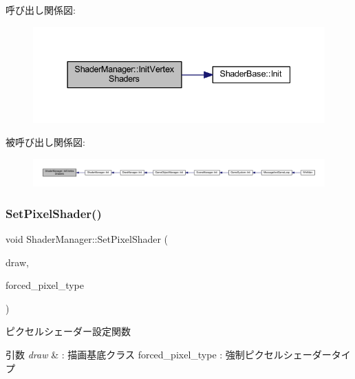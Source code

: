 呼び出し関係図\+:
\nopagebreak
\begin{figure}[H]
\begin{center}
\leavevmode
\includegraphics[width=337pt]{class_shader_manager_a9881e89daff32662e10f6ac48212ca06_cgraph}
\end{center}
\end{figure}
被呼び出し関係図\+:
\nopagebreak
\begin{figure}[H]
\begin{center}
\leavevmode
\includegraphics[width=350pt]{class_shader_manager_a9881e89daff32662e10f6ac48212ca06_icgraph}
\end{center}
\end{figure}
\mbox{\label{class_shader_manager_a6c954293001a33fafff216ff719618d5}} 
\subsubsection{\texorpdfstring{Set\+Pixel\+Shader()}{SetPixelShader()}}
{\footnotesize\ttfamily void Shader\+Manager\+::\+Set\+Pixel\+Shader (\begin{DoxyParamCaption}\item[{\mbox{\hyperlink{class_draw_base}{Draw\+Base}} $\ast$}]{draw,  }\item[{\mbox{\hyperlink{class_shader_manager_a7d15d773b3c6a99dd7086c45c8b0be5f}{Pixel\+Shader\+Type}}}]{forced\+\_\+pixel\+\_\+type }\end{DoxyParamCaption})\hspace{0.3cm}{\ttfamily [private]}}



ピクセルシェーダー設定関数 


\begin{DoxyParams}{引数}
{\em draw} & \+: 描画基底クラス forced\+\_\+pixel\+\_\+type \+: 強制ピクセルシェーダータイプ \\
\hline
\end{DoxyParams}


